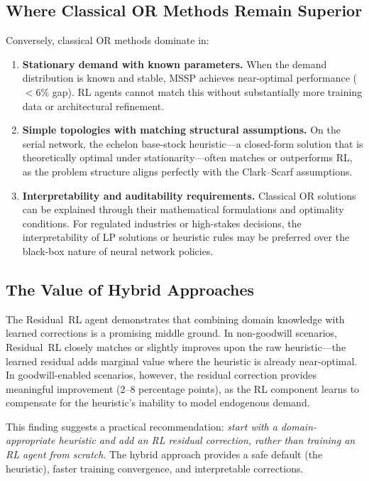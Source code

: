 \subsection{Where Classical OR Methods Remain Superior}

Conversely, classical OR methods dominate in:

\begin{enumerate}
  \item \textbf{Stationary demand with known parameters.} When the
        demand distribution is known and stable, MSSP achieves
        near-optimal performance ($<6\%$ gap). RL agents cannot match
        this without substantially more training data or architectural
        refinement.

  \item \textbf{Simple topologies with matching structural assumptions.}
        On the serial network, the echelon base-stock heuristic---a
        closed-form solution that is theoretically optimal under
        stationarity---often matches or outperforms RL, as the problem
        structure aligns perfectly with the Clark--Scarf
        assumptions.

  \item \textbf{Interpretability and auditability requirements.}
        Classical OR solutions can be explained through their
        mathematical formulations and optimality conditions.
        For regulated industries or high-stakes decisions, the
        interpretability of LP solutions or heuristic rules may be
        preferred over the black-box nature of neural network policies.
\end{enumerate}

\subsection{The Value of Hybrid Approaches}

The Residual~RL agent demonstrates that combining domain knowledge
with learned corrections is a promising middle ground. In
non-goodwill scenarios, Residual~RL closely matches or slightly
improves upon the raw heuristic---the learned residual adds marginal
value where the heuristic is already near-optimal. In goodwill-enabled
scenarios, however, the residual correction provides meaningful
improvement (2--8 percentage points), as the RL component learns to
compensate for the heuristic's inability to model endogenous demand.

This finding suggests a practical recommendation: \emph{start with a
domain-appropriate heuristic and add an RL residual correction,
rather than training an RL agent from scratch}. The hybrid approach
provides a safe default (the heuristic), faster training convergence,
and interpretable corrections.

